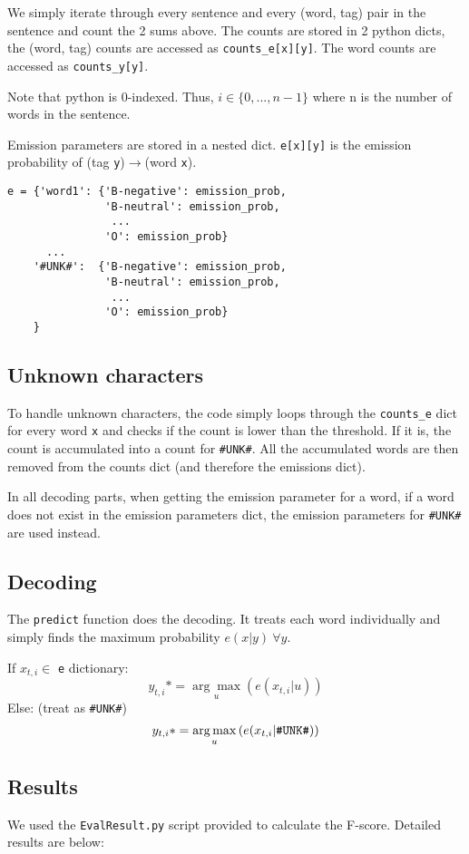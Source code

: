 \documentclass[12pt]{article}
\begin{document}
We simply iterate through every sentence and every (word, tag) pair in the sentence and count the 2 sums above.
The counts are stored in 2 python dicts, the (word, tag) counts are accessed as \verb|counts_e[x][y]|. The word counts are accessed as \verb|counts_y[y]|.

Note that python is 0-indexed. Thus, \(i \in \{0,...,n-1\}\) where n is the number of words in the sentence.

Emission parameters are stored in a nested dict. \verb|e[x][y]| is the emission probability of (tag \verb|y|)\(\rightarrow\)(word \verb|x|).

\begin{verbatim}
e = {'word1': {'B-negative': emission_prob,
               'B-neutral': emission_prob,
                ...
               'O': emission_prob}
      ...
    '#UNK#':  {'B-negative': emission_prob,
               'B-neutral': emission_prob,
                ...
               'O': emission_prob}
    }
\end{verbatim}

\subsection{Unknown characters}

To handle unknown characters, the code simply loops through the \verb|counts_e| dict for every word \texttt{x} and checks if the count is lower than the threshold. If it is, the count is accumulated into a count for \verb|#UNK#|. All the accumulated words are then removed from the counts dict (and therefore the emissions dict).

In all decoding parts, when getting the emission parameter for a word, if a word does not exist in the emission parameters dict, the emission parameters for \verb|#UNK#| are used instead.

\subsection{Decoding}

The \texttt{predict} function does the decoding. It treats each word individually and simply finds the maximum probability \( e(x|y) \ \forall y \).

If \(x_{t,i} \in \) \verb|e| dictionary:
\[y_{t,i}* = \underset{u}{\arg\max} \left( e(x_{t,i}|u) \right) \]
Else: (treat as \verb|#UNK#|)
\[y_{t,i}* = \underset{u}{\arg\max} \left( e(x_{t,i}|\verb|#UNK#|) \right) \]

\subsection{Results}
We used the \texttt{EvalResult.py} script provided to calculate the F-score. Detailed results are below:
\end{document}
